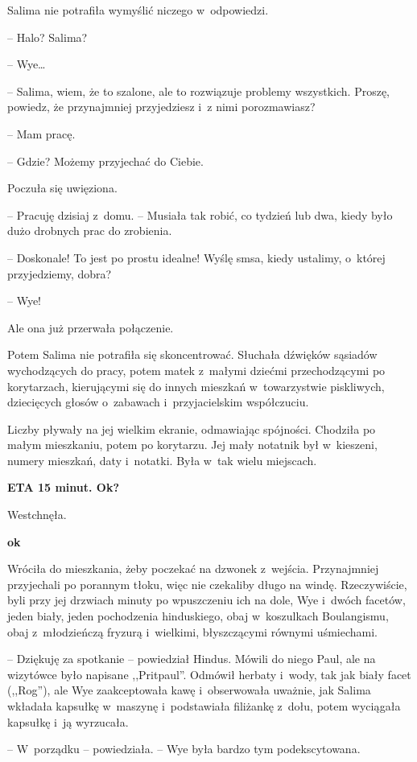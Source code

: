 \documentclass[oneside,polish,11pt,sfheadings]{mwbk}
\begin{document}
Salima nie potrafiła wymyślić niczego w~odpowiedzi.

-- Halo? Salima?

-- Wye\ldots 

-- Salima, wiem, że to szalone, ale to rozwiązuje problemy wszystkich.
Proszę, powiedz, że przynajmniej przyjedziesz i~z nimi porozmawiasz?

-- Mam pracę.

-- Gdzie? Możemy przyjechać do Ciebie.

Poczuła się uwięziona. 

-- Pracuję dzisiaj z~domu. -- Musiała tak robić, co
tydzień lub dwa, kiedy było dużo drobnych prac do zrobienia.

-- Doskonale! To jest po prostu idealne! Wyślę smsa, kiedy ustalimy, o~której przyjedziemy, dobra?

-- Wye!

Ale ona już przerwała połączenie.

Potem Salima nie potrafiła się skoncentrować. Słuchała dźwięków sąsiadów
wychodzących do pracy, potem matek z~małymi dziećmi przechodzącymi po
korytarzach, kierującymi się do innych mieszkań w~towarzystwie
piskliwych, dziecięcych głosów o~zabawach i~przyjacielskim współczuciu.

Liczby pływały na jej wielkim ekranie, odmawiając spójności. Chodziła po
małym mieszkaniu, potem po korytarzu. Jej mały notatnik był w~kieszeni,
numery mieszkań, daty i~notatki. Była w~tak wielu miejscach.

\textbf{ ETA 15 minut. Ok?}

Westchnęła.

\textbf{ ok}

Wróciła do mieszkania, żeby poczekać na dzwonek z~wejścia. Przynajmniej
przyjechali po porannym tłoku, więc nie czekaliby długo na windę.
Rzeczywiście, byli przy jej drzwiach minuty po wpuszczeniu ich na dole,
Wye i~dwóch facetów, jeden biały, jeden pochodzenia hinduskiego, obaj w~koszulkach Boulangismu, obaj z~młodzieńczą fryzurą i~wielkimi,
błyszczącymi równymi uśmiechami.

-- Dziękuję za spotkanie -- powiedział Hindus. Mówili do niego Paul, ale
na wizytówce było napisane ,,Pritpaul''. Odmówił herbaty i~wody, tak jak
biały facet (,,Rog''), ale Wye zaakceptowała kawę i~obserwowała uważnie,
jak Salima wkładała kapsułkę w~maszynę i~podstawiała filiżankę z~dołu,
potem wyciągała kapsułkę i~ją wyrzucała.

-- W~porządku -- powiedziała. -- Wye była bardzo tym podekscytowana.
\end{document}
